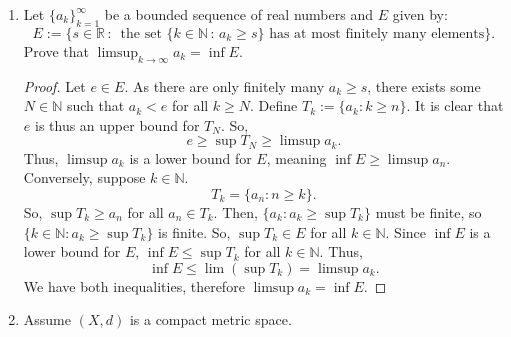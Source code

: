 \documentclass[reqno]{article}
\theoremstyle{remark}
\numberwithin{equation}{section}
\newcommand{\N}{\mathbb{N}}
\newcommand{\R}{\mathbb{R}}
\begin{document}
\begin{enumerate}
\begin{enumerate}
\begin{proof}
\begin{eqnarray*}
      \left| f(x_n) - f(x_{n+1}) \right|
    &=& \left|\frac{n(n+1)}{2n+1} - \frac{(n+1)(n+2)}{2n+3} \right| 
    = \left|\frac{n(n+1)(2n+3) - (n+1)(n+2)(2n+1)}{(2n+1)(2n+3)}  \right| \\ 
    &=&  \left|\frac{(2n^3+5n^2+3n) - (2n^3+7n^2+7n+2)}{(2n+1)(2n+3)}  \right|
    = \left|\frac{ 2n^2+4n+2 }{4n^2 + 8n + 3}  \right| \\
    &\geq& \left| \frac{2n^2}{ 16n^2 } \right| =  \frac{1}{8}.
\end{eqnarray*}
    So for any $\delta > 0$, we see that there exists two points $x_n, x_{n+1} \in (0,1)$ such that $|x_n - x_{n+1}| < \delta$ when $n$ is sufficiently large 
    but $f(x_n) - f(x_{n+1}) | \not < \epsilon$. Therefore $f(x)$ is not uniformly 
    continuous.

\end{proof}

\end{enumerate} 

\item Let $\{a_k\}_{k=1}^\infty$ be a bounded sequence of real numbers and $E$ given by: 
$$
E:= \bigg\{s \in \R \, \colon \, \text{ the set } \{k \in \N \, \colon \, a_k \geq s\} \text{ has at most finitely many elements}\bigg\}. 
$$
Prove that $\limsup_{k \to \infty} a_k = \inf E$. 

\begin{proof}
Let $e \in E$. As there are only finitely many $a_k \geq s$, there exists some $N \in \mathbb{N}$ such that $a_k < e$ for all $k \geq N$. Define $T_k := \{a_k : k \geq n\}$. It is clear that $e$ is thus an upper bound for $T_N$. So, $$e \geq \sup T_N \geq \limsup a_k.$$
Thus, $\limsup a_k$ is a lower bound for $E$, meaning $\inf E \geq \limsup a_n$.\\
Conversely, suppose $k \in \mathbb{N}$. $$T_k = \{a_n : n \geq k \}.$$
So, $\sup T_k \geq a_n$ for all $a_n \in T_k$. Then, $\{a_k : a_k \geq \sup T_k\}$ must be finite, so $\{k \in \mathbb{N} : a_k \geq \sup T_k\}$ is finite. So, $\sup T_k \in E$ for all $k \in \N$. Since $\inf E$ is a lower bound for $E$, $\inf E \leq \sup T_k$ for all $k \in \N$. Thus, $$\inf E \leq \lim (\sup T_k) = \limsup a_k.$$
We have both inequalities, therefore $\limsup a_k = \inf E$.
\end{proof} 

\item Assume $(X,d)$ is a compact metric space.

\begin{enumerate}


\end{enumerate}
\end{enumerate}
\end{document}
